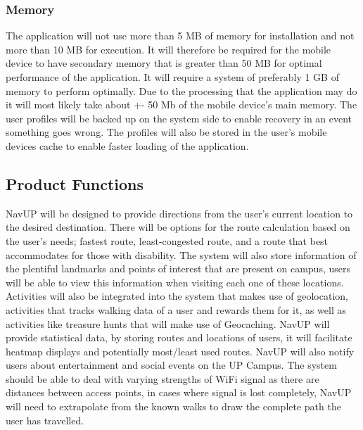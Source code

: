 \documentclass[12pt,a4paper]{article}
\begin{document}
		\subsubsection{Memory}
			The application will not use more than 5 MB of memory for installation and not more than 10 MB for execution. It will therefore be required for the mobile device to have secondary memory that is greater than 50 MB for optimal performance of the application. It will require a system of preferably 1 GB of memory to perform optimally. Due to the processing that the application may do it will most likely take about +- 50 Mb of the mobile device's main memory. The user profiles will be backed up on the system side to enable recovery in an event something goes wrong. The profiles will also be stored in the user’s mobile devices cache to enable faster loading of the application.
	\subsection{Product Functions}
		NavUP will be designed to provide directions from the user’s current location to the desired destination. There will be options for the route calculation based on the user’s needs; fastest route, least-congested route, and a route that best accommodates for those with disability. The system will also store information of the plentiful landmarks and points of interest that are present on campus, users will be able to view this information when visiting each one of these locations. Activities will also be integrated into the system that makes use of geolocation, activities that tracks walking data of a user and rewards them for it, as well as activities like treasure hunts that will make use of Geocaching. NavUP will provide statistical data, by storing routes and locations of users, it will facilitate heatmap displays and potentially most/least used routes. NavUP will also notify users about entertainment and social events on the UP Campus. The system should be able to deal with varying strengths of WiFi signal as there are distances between access points, in cases where signal is lost completely, NavUP will need to extrapolate from the known walks to draw the complete path the user has travelled.
\end{document}
